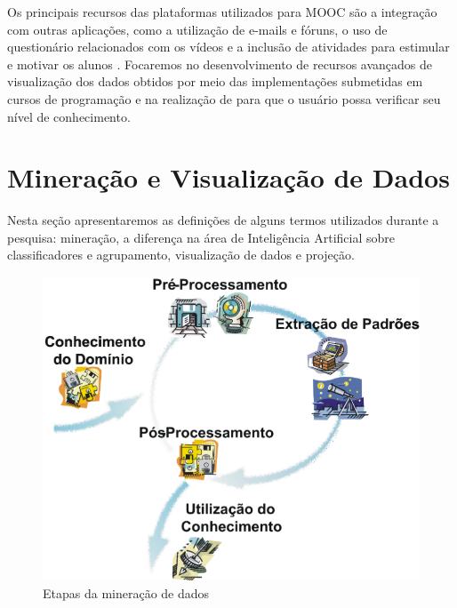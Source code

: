 		Os principais recursos das plataformas utilizados para MOOC são a integração com outras
		aplicações, como a utilização de e-mails e fóruns, o uso de questionário
		relacionados com os vídeos e a inclusão de atividades para estimular e
		motivar os alunos \cite{fassbinder2014}. %
		 Focaremos no desenvolvimento de 
		recursos avançados de visualização dos dados obtidos por meio das
		implementações submetidas em cursos de programação e na realização de
		 para que o usuário possa verificar seu nível de conhecimento.

	\section{Mineração e Visualização de Dados}
	\label{sec:FundTeor}
		Nesta seção apresentaremos as definições de alguns termos utilizados
		durante a pesquisa: mineração, a diferença na área de Inteligência
		Artificial sobre classificadores e agrupamento, visualização de dados e projeção.

		\begin{figure}[h]
			\centering
			\includegraphics[width=0.6\linewidth]{imagem/mineracaoDados}
			\caption[Etapas da mineração de dados]{Etapas da mineração de dados \cite{rezende2003}}
			\label{fig:mineracaoDados}
		\end{figure}
		
